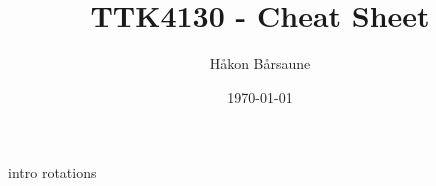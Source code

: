 \documentclass{article}
\title{TTK4130 - Cheat Sheet}
\author{Håkon Bårsaune}
\date{\today}
\begin{document}
\maketitle

\tableofcontents

\newpage

\begin{multicols}{2}
{intro} \newpage
{rotations}
\end{multicols}
\end{document}
